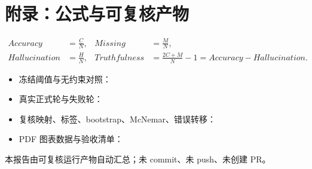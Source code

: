 \documentclass[11pt,a4paper,fontset=none]{ctexart}
\begin{document}
\section*{附录：公式与可复核产物}
\[
\begin{aligned}
Accuracy&=\frac{C}{N}, & Missing&=\frac{M}{N},\\
Hallucination&=\frac{H}{N}, & Truthfulness&=\frac{2C+M}{N}-1=Accuracy-Hallucination.
\end{aligned}
\]

\begin{itemize}
  \item 冻结阈值与无约束对照：
  \item 真实正式轮与失败轮：
  \item 复核映射、标签、bootstrap、McNemar、错误转移：
  \item PDF 图表数据与验收清单：
\end{itemize}

\vfill
\begin{center}\color{muted}\small 本报告由可复核运行产物自动汇总；未 commit、未 push、未创建 PR。\end{center}
\end{document}
